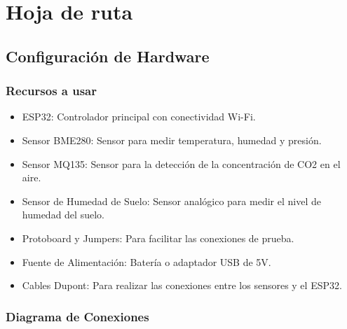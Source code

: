 \documentclass[../main]{subfiles}
\begin{document}
\section{Hoja de ruta}

\subsection{Configuración de Hardware}

\subsubsection{Recursos a usar}

\begin{itemize}
	\item ESP32: Controlador principal con conectividad Wi-Fi.
	\item Sensor BME280: Sensor para medir temperatura, humedad y presión.
	\item Sensor MQ135: Sensor para la detección de la concentración de CO2 en el aire.
	\item Sensor de Humedad de Suelo: Sensor analógico para medir el nivel de humedad del suelo.
	\item Protoboard y Jumpers: Para facilitar las conexiones de prueba.
	\item Fuente de Alimentación: Batería o adaptador USB de 5V.
	\item Cables Dupont: Para realizar las conexiones entre los sensores y el ESP32.
\end{itemize}

\subsubsection{Diagrama de Conexiones}
\end{document}
